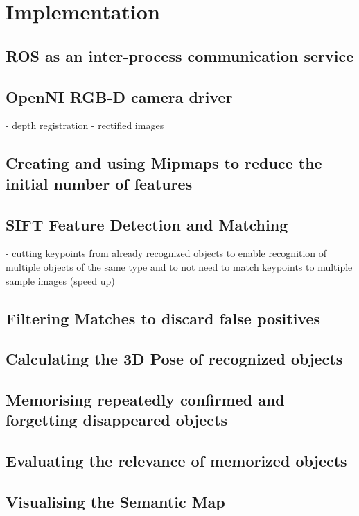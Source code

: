 \chapter{Implementation}

\section{ROS as an inter-process communication service}

\section{OpenNI RGB-D camera driver}
- depth registration
- rectified images

\section{Creating and using Mipmaps to reduce the initial number of features}

\section{SIFT Feature Detection and Matching}
- cutting keypoints from already recognized objects to enable recognition of multiple objects of the same type and to not need to match keypoints to multiple sample images (speed up)

\section{Filtering Matches to discard false positives}

\section{Calculating the 3D Pose of recognized objects}

\section{Memorising repeatedly confirmed and forgetting disappeared objects}

\section{Evaluating the relevance of memorized objects}

\section{Visualising the Semantic Map}


